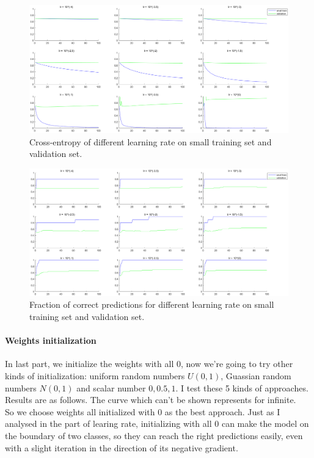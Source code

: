 \documentclass{article}
\begin{document}
\begin{figure}[H]
	\centering
	\includegraphics[scale=0.4]{figure4}
	\caption{Cross-entropy of different learning rate on small training set and validation set.}
	\label{fig4}
\end{figure}

\begin{figure}[H]
	\centering
	\includegraphics[scale=0.4]{figure5}
	\caption{Fraction of correct predictions for different  learning rate on small training set and validation set.}
	\label{fig5}
\end{figure}

\paragraph{Weights initialization}
In last part, we initialize the weights with all $0$, now we're going to try other kinds of initialization: uniform random numbers $U(0,1)$, Guassian random numbers $N(0,1)$ and scalar number $0, 0.5, 1$. I test these 5 kinds of approaches. Results are as follows. The curve which can't be shown represents for infinite.\\

So we choose weights all initialized with $0$ as the best approach. Just as I analysed in the part of learing rate, initializing with all $0$ can make the model on the boundary of two classes, so they can reach the right predictions easily, even with a slight iteration in the direction of its negative gradient.
\end{document}
